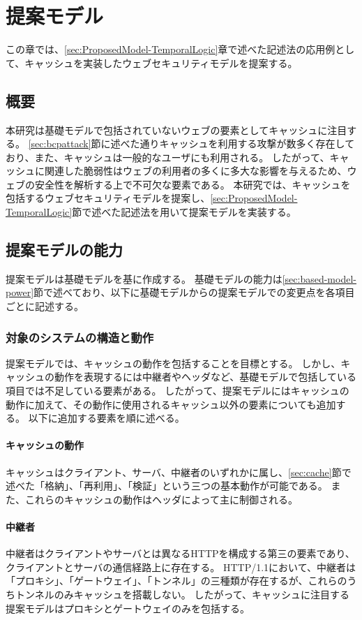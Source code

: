 \documentclass[12pt,a4paper]{jbook}
\begin{document}
\newpage

\chapter{提案モデル}
この章では、\ref{sec:ProposedModel-TemporalLogic}章で述べた記述法の応用例として、キャッシュを実装したウェブセキュリティモデルを提案する。

\section{概要}
本研究は基礎モデルで包括されていないウェブの要素としてキャッシュに注目する。
\ref{sec:bcpattack}節に述べた通りキャッシュを利用する攻撃が数多く存在しており、また、キャッシュは一般的なユーザにも利用される。
したがって、キャッシュに関連した脆弱性はウェブの利用者の多くに多大な影響を与えるため、ウェブの安全性を解析する上で不可欠な要素である。
本研究では、キャッシュを包括するウェブセキュリティモデルを提案し、\ref{sec:ProposedModel-TemporalLogic}節で述べた記述法を用いて提案モデルを実装する。

\section{提案モデルの能力}
\label{sec:ProposedModel-Power}
提案モデルは基礎モデルを基に作成する。
基礎モデルの能力は\ref{sec:based-model-power}節で述べており、以下に基礎モデルからの提案モデルでの変更点を各項目ごとに記述する。

\subsection{対象のシステムの構造と動作}
提案モデルでは、キャッシュの動作を包括することを目標とする。
しかし、キャッシュの動作を表現するには中継者やヘッダなど、基礎モデルで包括している項目では不足している要素がある。
したがって、提案モデルにはキャッシュの動作に加えて、その動作に使用されるキャッシュ以外の要素についても追加する。
以下に追加する要素を順に述べる。

\subsubsection{キャッシュの動作}
キャッシュはクライアント、サーバ、中継者のいずれかに属し、\ref{sec:cache}節で述べた「格納」、「再利用」、「検証」という三つの基本動作が可能である。
また、これらのキャッシュの動作はヘッダによって主に制御される。

\subsubsection{中継者}
中継者はクライアントやサーバとは異なるHTTPを構成する第三の要素であり、クライアントとサーバの通信経路上に存在する。
HTTP/1.1において、中継者は「プロキシ」、「ゲートウェイ」、「トンネル」の三種類が存在するが、これらのうちトンネルのみキャッシュを搭載しない。
したがって、キャッシュに注目する提案モデルはプロキシとゲートウェイのみを包括する。
\end{document}
